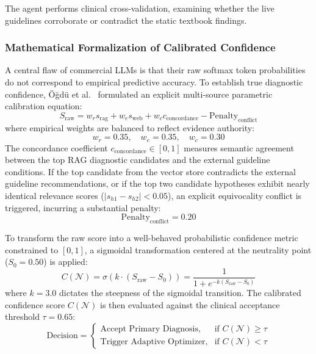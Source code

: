 \documentclass[conference]{IEEEtran}
\begin{document}
The agent performs clinical cross-validation, examining whether the live guidelines corroborate or contradict the static textbook findings.

\subsubsection{Mathematical Formalization of Calibrated Confidence}
A central flaw of commercial LLMs is that their raw softmax token probabilities do not correspond to empirical predictive accuracy. To establish true diagnostic confidence, Öğdü et al.~\cite{ogdu2025adaptive} formulated an explicit multi-source parametric calibration equation:
\begin{equation}
\label{eq:raw_score}
S_{\text{raw}} = w_r s_{\text{rag}} + w_e s_{\text{web}} + w_c c_{\text{concordance}} - \text{Penalty}_{\text{conflict}}
\end{equation}
where empirical weights are balanced to reflect evidence authority:
\begin{equation}
w_r = 0.35, \quad w_e = 0.35, \quad w_c = 0.30
\end{equation}
The concordance coefficient $c_{\text{concordance}} \in [0, 1]$ measures semantic agreement between the top RAG diagnostic candidates and the external guideline conditions. If the top candidate from the vector store contradicts the external guideline recommendations, or if the top two candidate hypotheses exhibit nearly identical relevance scores ($|s_{h1} - s_{h2}| < 0.05$), an explicit equivocality conflict is triggered, incurring a substantial penalty:
\begin{equation}
\text{Penalty}_{\text{conflict}} = 0.20
\end{equation}

To transform the raw score into a well-behaved probabilistic confidence metric constrained to $[0, 1]$, a sigmoidal transformation centered at the neutrality point ($S_0 = 0.50$) is applied:
\begin{equation}
\label{eq:calibrated_conf}
C(\mathcal{N}) = \sigma\left(k \cdot (S_{\text{raw}} - S_0)\right) = \frac{1}{1 + e^{-k(S_{\text{raw}} - S_0)}}
\end{equation}
where $k = 3.0$ dictates the steepness of the sigmoidal transition. The calibrated confidence score $C(\mathcal{N})$ is then evaluated against the clinical acceptance threshold $\tau = 0.65$:
\begin{equation}
\text{Decision} = 
\begin{cases}
\text{Accept Primary Diagnosis}, & \text{if } C(\mathcal{N}) \ge \tau \\
\text{Trigger Adaptive Optimizer}, & \text{if } C(\mathcal{N}) < \tau
\end{cases}
\end{equation}
\end{document}

